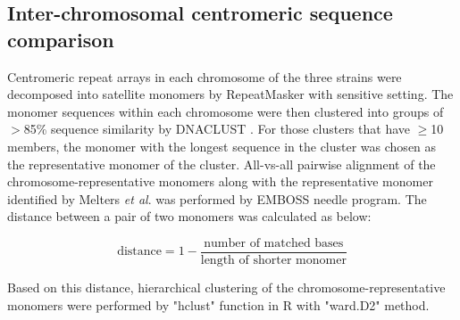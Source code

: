 \subsection*{Inter-chromosomal centromeric sequence comparison}
Centromeric repeat arrays in each chromosome of the three strains were decomposed into satellite monomers by RepeatMasker with sensitive setting. The monomer sequences within each chromosome were then clustered into groups of $>$85\% sequence similarity by DNACLUST \cite{}. For those clusters that have $\geq$10 members, the monomer with the longest sequence in the cluster was chosen as the representative monomer of the cluster. All-vs-all pairwise alignment of the chromosome-representative monomers along with the representative monomer identified by Melters \textit{et al}. was performed by EMBOSS needle program. The distance between a pair of two monomers was calculated as below:

\[
  \mbox{distance} = 1 - \frac{\mbox{number of matched bases}}{\mbox{length of shorter monomer}}
\]

Based on this distance, hierarchical clustering of the chromosome-representative monomers were performed by "hclust" function in R with "ward.D2" method.

